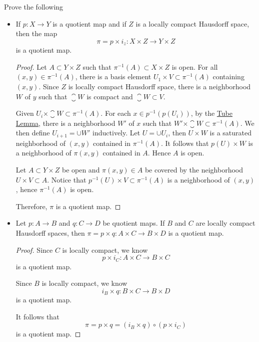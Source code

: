 \documentclass[12pt,a4paper]{article}
\begin{document}
    \begin{ex}
        Prove the following
        \begin{itemize}
            \item If $p:X\to Y$ is a quotient map and if $Z$ is a locally compact Hausdorff space, then the map
            $$
            \pi=p\times i_z: X\times Z\to Y\times Z
            $$
            is a quotient map.
            \begin{proof}
                Let $A\subset Y\times Z$ such that $\pi^{-1}(A)\subset X\times Z$ is open. For all $(x,y)\in \pi^{-1}(A)$, there is a basis element $U_1\times V\subset \pi^{-1}(A)$ containing $(x,y)$. Since $Z$ is locally compact Hausdorff space, there is a neighborhood $W$ of $y$ such that $\closure{W}$ is compact and $\closure{W}\subset V$.
                
                Given $U_i\times \closure{W}\subset \pi^{-1}(A)$. For each $x\in p^{-1}(p(U_i))$, by the \hyperref[3.4.9]{Tube Lemma}, there is a neighborhood $W'$ of $x$ such that $W'\times \closure{W}\subset\pi^{-1}(A)$. We then define $U_{i+1}=\cup W'$ inductively. Let $U=\cup U_i$, then $U\times W$ is a saturated neighborhood of $(x,y)$ contained in $\pi^{-1}(A)$. It follows that $p(U)\times W$ is a neighborhood of $\pi(x,y)$ contained in $A$. Hence $A$ is open.

                Let $A\subset Y\times Z$ be open and $\pi(x,y)\in A$ be covered by the neighborhood $U\times V\subset A$. Notice that $p^{-1}(U)\times V\subset \pi^{-1}(A)$ is a neighborhood of $(x,y)$, hence $\pi^{-1}(A)$ is open.
                
                Therefore, $\pi$ is a quotient map.
            \end{proof}
            \item Let $p:A\to B$ and $q:C\to D$ be quotient maps. If $B$ and $C$ are locally compact Hausdorff spaces, then $\pi=p\times q:A\times C\to B\times D$ is a quotient map.
            \begin{proof}
                Since $C$ is locally compact, we know
                $$
                p\times i_C:A\times C\to B\times C
                $$
                is a quotient map.

                Since $B$ is locally compact, we know
                $$
                i_B\times q:B\times C\to B\times D
                $$
                is a quotient map.

                It follows that 
                $$
                \pi=p\times q = (i_B\times q)\circ (p\times i_C)
                $$
                is a quotient map.
            \end{proof}
        \end{itemize}
    \end{ex}
    \hfill
\end{document}
